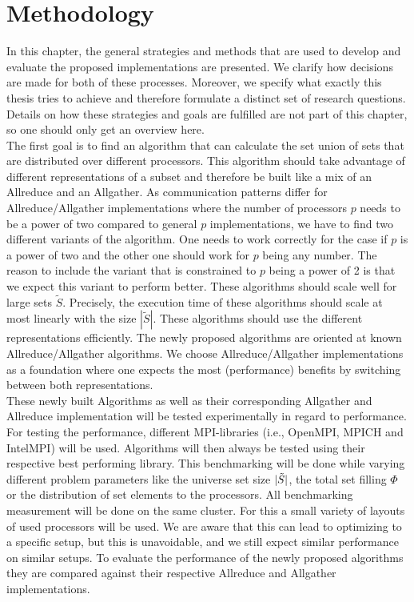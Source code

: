 
\chapter{Methodology} \label{chap:methodology}
In this chapter, the general strategies and methods that are used to develop and evaluate the proposed implementations are presented. We clarify how decisions are made for both of these processes. Moreover, we specify what exactly this thesis tries to achieve and therefore formulate a distinct set of research questions. Details on how these strategies and goals are fulfilled are not part of this chapter, so one should only get an overview here.\\
The first goal is to find an algorithm that can calculate the set union of sets that are distributed over different processors. This algorithm should take advantage  of different representations of a subset and therefore be built like a mix of an Allreduce and an Allgather. As communication patterns differ for Allreduce/Allgather implementations where the number of processors $p$ needs to be a power of two compared to general $p$ implementations, we have to find two different variants of the algorithm. One needs to work correctly for the case if $p$ is a power of two and the other one should work for $p$ being any number. The reason to include the variant that is constrained to $p$ being a power of 2 is that we expect this variant to perform better. These algorithms should scale well for large sets $\tilde{S}$. Precisely, the execution time of these algorithms should scale at most linearly with the size $|\tilde{S}|$. These algorithms should use the different representations efficiently. The newly proposed algorithms are oriented at known Allreduce/Allgather algorithms. We choose Allreduce/Allgather implementations as a foundation where one expects the most (performance) benefits by switching between both representations.\\
These newly built Algorithms as well as their corresponding Allgather and Allreduce implementation will be tested experimentally in regard to performance. For testing the performance, different MPI-libraries (i.e., OpenMPI, MPICH and IntelMPI) will be used. Algorithms will then always be tested using their respective best performing library. This benchmarking will be done while varying different problem parameters like the universe set size $|\Tilde{S}|$, the total set filling $\Phi$ or the distribution of set elements to the processors. All benchmarking measurement will be done on the same cluster. For this a small variety of layouts of used processors will be used. We are aware that this can lead to optimizing to a specific setup, but this is unavoidable, and we still expect similar performance on similar setups. To evaluate the performance of the newly proposed algorithms they are compared against their respective Allreduce and Allgather implementations. \\
